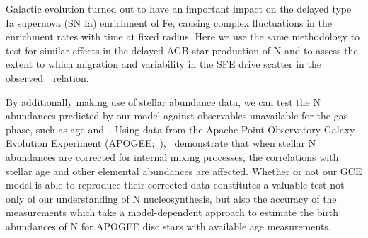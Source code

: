 \documentclass[ms.tex]{subfiles}
\begin{document}
Galactic evolution turned out to have an important impact on the delayed type
Ia supernova (SN Ia) enrichment of Fe, causing complex fluctuations in the
enrichment rates with time at fixed radius.
Here we use the same methodology to test for similar effects in the delayed AGB
star production of N and to assess the extent to which migration and
variability in the SFE drive scatter in the observed~\ohno~relation.
\par
By additionally making use of stellar abundance data, we can test the N
abundances predicted by our model against observables unavailable for the gas
phase, such as age and~\ofe.
Using data from the Apache Point Observatory Galaxy Evolution Experiment
(APOGEE;~\citealp{Majewski2017}),~\citet{Vincenzo2021} demonstrate that when
stellar N abundances are corrected for internal mixing processes, the
correlations with stellar age and other elemental abundances are affected.
Whether or not our GCE model is able to reproduce their corrected data
constitutes a valuable test not only of our understanding of N nucleosynthesis,
but also the accuracy of the~\citet{Vincenzo2021} measurements which take a
model-dependent approach to estimate the birth abundances of N for APOGEE disc
stars with available age measurements.
\end{document}
